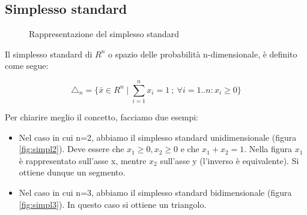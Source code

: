 \subsection{Simplesso standard}

\begin{figure}[htbp]
  \centering
  \caption{Rappresentazione del simplesso standard}
  \label{fig:animals}
\end{figure}

Il simplesso standard di $R^n$ o spazio delle probabilità n-dimensionale, è definito come segue:
\begin{definizione}

 \[ \triangle_n = \{ \bar{x} \in R^n \mid \sum_{i=1}^{n} x_i=1 \ ; \ \forall i=1..n: x_i \ge 0 \} \]
\end{definizione}

Per chiarire meglio il concetto, facciamo due esempi:
\begin{itemize}
 \item Nel caso in cui n=2, abbiamo il simplesso standard unidimensionale (figura \ref{fig:simpl2}).
       Deve essere che $x_1 \ge 0, x_2 \ge 0$ e che $x_1+x_2=1$. Nella figura $x_1$ è rappresentato 
       sull'asse x, mentre $x_2$ sull'asse y (l'inverso è equivalente).
       Si ottiene dunque un segmento.
 \item Nel caso in cui n=3, abbiamo il simplesso standard bidimensionale (figura \ref{fig:simpl3}).
       In questo caso si ottiene un triangolo.
\end{itemize}





